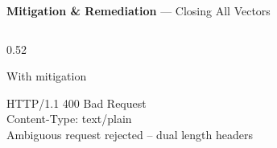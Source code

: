 \documentclass[aspectratio=169,10pt]{beamer}
\begin{document}
\begin{frame}{\textbf{Mitigation \& Remediation} --- Closing All Vectors}
\begin{columns}[T,totalwidth=\textwidth]
\begin{column}{0.52\textwidth}
\begin{exampleblock}{\small With mitigation}
\vspace{1mm}
{\ttfamily\tiny
\colorbox{codebg}{\parbox{\dimexpr\linewidth-2\fboxsep-2pt}{%
  \color{accentlight}%
  HTTP/1.1 400 Bad Request\\
  Content-Type: text/plain\\[2pt]
  \color{success}%
  Ambiguous request rejected -- dual length headers
}}}
\vspace{1mm}
\end{exampleblock}

\vspace{1mm}
\begin{center}
\end{center}

\end{column}
\end{columns}

\end{frame}
\end{document}
